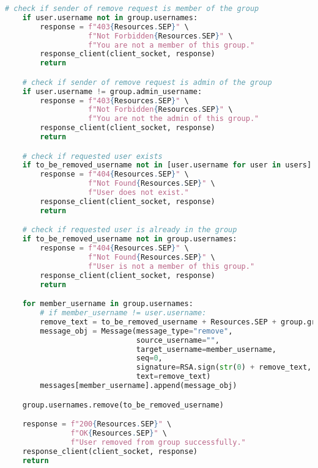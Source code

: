 \begin{latin}
\begin{lstlisting}[firstnumber=234, language=Python]
    # check if sender of remove request is member of the group
    if user.username not in group.usernames:
        response = f"403{Resources.SEP}" \
                   f"Not Forbidden{Resources.SEP}" \
                   f"You are not a member of this group."
        response_client(client_socket, response)
        return

    # check if sender of remove request is admin of the group
    if user.username != group.admin_username:
        response = f"403{Resources.SEP}" \
                   f"Not Forbidden{Resources.SEP}" \
                   f"You are not the admin of this group."
        response_client(client_socket, response)
        return

    # check if requested user exists
    if to_be_removed_username not in [user.username for user in users]:
        response = f"404{Resources.SEP}" \
                   f"Not Found{Resources.SEP}" \
                   f"User does not exist."
        response_client(client_socket, response)
        return

    # check if requested user is already in the group
    if to_be_removed_username not in group.usernames:
        response = f"404{Resources.SEP}" \
                   f"Not Found{Resources.SEP}" \
                   f"User is not a member of this group."
        response_client(client_socket, response)
        return

    for member_username in group.usernames:
        # if member_username != user.username:
        remove_text = to_be_removed_username + Resources.SEP + group.group_name
        message_obj = Message(message_type="remove",
                              source_username="",
                              target_username=member_username,
                              seq=0,
                              signature=RSA.sign(str(0) + remove_text, server_private_key),
                              text=remove_text)
        messages[member_username].append(message_obj)

    group.usernames.remove(to_be_removed_username)

    response = f"200{Resources.SEP}" \
               f"OK{Resources.SEP}" \
               f"User removed from group successfully."
    response_client(client_socket, response)
    return
\end{lstlisting}
\end{latin}


